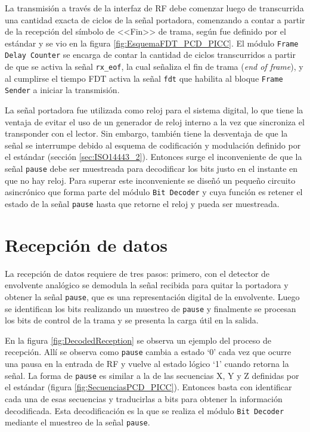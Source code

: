 La transmisión a través de la interfaz de RF debe comenzar luego de
transcurrida una cantidad exacta de ciclos de la señal portadora, 
comenzando a contar a partir de la recepción del símbolo de <<Fin>> 
de trama, según fue definido por el estándar y se vio en la figura 
\ref{fig:EsquemaFDT_PCD_PICC}. El módulo \lstinline{Frame Delay Counter}
se encarga de contar la cantidad de ciclos transcurridos a partir de que
se activa la señal \lstinline{rx_eof}, la cual señaliza el fin de trama 
(\emph{end of frame}), y al cumplirse el tiempo FDT activa la señal 
\lstinline{fdt} que habilita al bloque \lstinline{Frame Sender} a 
iniciar la transmisión. 
	
La señal portadora fue utilizada como reloj para el sistema digital, 
lo que tiene la ventaja de evitar el uso de un generador de reloj 
interno a la vez que sincroniza el transponder con el lector. Sin 
embargo, también tiene la desventaja de que la señal se interrumpe 
debido al esquema de codificación y modulación definido por el 
estándar (sección \ref{sec:ISO14443_2}). Entonces surge el 
inconveniente de que la señal \lstinline{pause} debe ser muestreada 
para decodificar los bits justo en el instante en que no hay reloj. 
Para superar este inconveniente se diseñó un pequeño circuito 
asincrónico que forma parte del módulo \lstinline{Bit Decoder} y 
cuya función es retener el estado de la señal \lstinline{pause} 
hasta que retorne el reloj y pueda ser muestreada.


\section{Recepción de datos}

La recepción de datos requiere de tres pasos: primero, con el detector 
de envolvente analógico se demodula la señal recibida para quitar la 
portadora y obtener la señal \lstinline{pause}, que es una 
representación digital de la envolvente. Luego se identifican los bits 
realizando un muestreo de \lstinline{pause} y finalmente se procesan 
los bits de control de la trama y se presenta la carga útil en la 
salida. 

En la figura \ref{fig:DecodedReception} se observa un ejemplo del 
proceso de recepción. Allí se observa como \lstinline{pause} 
cambia a estado `0' cada vez que ocurre una pausa en la entrada de 
RF y vuelve al estado lógico `1' cuando retorna la señal. La forma 
de \lstinline{pause} es similar a la de las secuencias X, Y y Z 
definidas por el estándar (figura \ref {fig:SecuenciasPCD_PICC}). 
Entonces basta con identificar cada una de esas secuencias y 
traducirlas a bits para obtener la información decodificada. Esta 
decodificación es la que se realiza el módulo \lstinline{Bit Decoder}
mediante el muestreo de la señal \lstinline{pause}.

